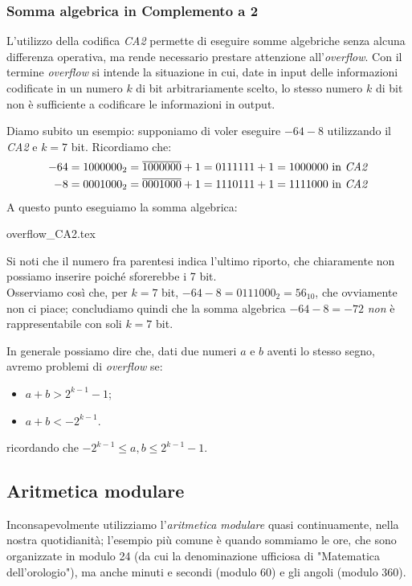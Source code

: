 \documentclass[class=book, crop=false, oneside]{standalone}
\begin{document}
\subsubsection{Somma algebrica in Complemento a 2}
L'utilizzo della codifica \emph{CA2} permette di eseguire somme algebriche senza alcuna differenza operativa, ma rende necessario prestare attenzione all'\emph{overflow}. Con il termine \emph{overflow} si intende la situazione in cui, date in input delle informazioni codificate in un numero \(k\) di bit arbitrariamente scelto, lo stesso numero \(k\) di bit non è sufficiente a codificare le informazioni in output.

Diamo subito un esempio: supponiamo di voler eseguire \(-64-8\) utilizzando il \emph{CA2} e \(k=7\) bit. Ricordiamo che:
\begin{align*}
-64=1000000_{2}=\overline{1000000}+1=0111111+1=1000000 \text{ in \emph{CA2}}\\
-8=0001000_{2}=\overline{0001000}+1=1110111+1=1111000 \text{ in \emph{CA2}}
\end{align*}
A questo punto eseguiamo la somma algebrica:
\begin{table}[H]
	\centering
	{overflow_CA2.tex}
\end{table}
Si noti che il numero fra parentesi indica l'ultimo riporto, che chiaramente non possiamo inserire poiché sforerebbe i 7 bit.\\
Osserviamo così che, per \(k=7\) bit, \(-64-8=0111000_{2}=56_{10}\), che ovviamente non ci piace; concludiamo quindi che la somma algebrica \(-64-8=-72\) \emph{non} è rappresentabile con soli \(k=7\) bit.

In generale possiamo dire che, dati due numeri \(a\) e \(b\) aventi lo stesso segno, avremo problemi di \emph{overflow} se:
\begin{itemize}
	\item \(a+b>2^{k-1}-1\);
	\item \(a+b<-2^{k-1}\).
\end{itemize}
ricordando che \(-2^{k-1}\le a,b\le 2^{k-1}-1\).

\subsection{Aritmetica modulare}
Inconsapevolmente utilizziamo l'\emph{aritmetica modulare} quasi continuamente, nella nostra quotidianità; l'esempio più comune è quando sommiamo le ore, che sono organizzate in modulo 24 (da cui la denominazione ufficiosa di "Matematica dell'orologio"), ma anche minuti e secondi (modulo 60) e gli angoli (modulo 360).
\end{document}
